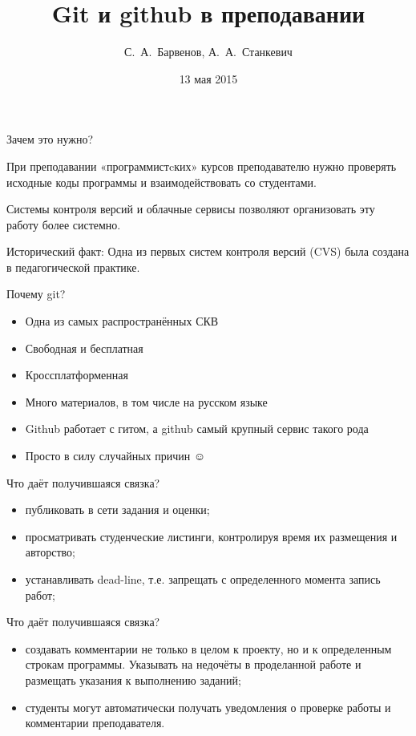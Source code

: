\documentclass[xetex,14pt,serif,compress,hyperref={xetex}]{beamer}
\author{С.~А.~Барвенов, А.~А.~Станкевич}
\title{Git и github в преподавании}
\date{13 мая 2015}
\begin{document}
\begin{frame}
\titlepage
\end{frame}
\begin{frame}{Зачем это нужно?}

\parbox{\linewidth}{\Large{При преподавании «программистcких» курсов 
преподавателю нужно проверять 
исходные коды программы и взаимодействовать со студентами.}}


\end{frame}
\begin{frame}
\parbox{\linewidth}{\Large{Системы контроля версий и облачные сервисы позволяют 
организовать эту работу более системно.}}
\end{frame}
\begin{frame}
\begin{block}{Исторический факт:}
  Одна из первых систем контроля версий (CVS) была создана в 
педагогической практике.
\end{block}
\end{frame}
\begin{frame}{Почему git?}
 \begin{itemize}
  \item Одна из самых распространённых СКВ
  \item Свободная и бесплатная
  \item Кроссплатформенная
  \item Много материалов, в том числе на русском языке
  \item Github работает с гитом, а github самый крупный сервис такого рода
  \item Просто в силу случайных причин ☺
 \end{itemize}

\end{frame}
\begin{frame}{Что даёт получившаяся связка?}
 \begin{itemize}
  \item публиковать в сети задания и оценки;

\item просматривать студенческие листинги, контролируя время их размещения и 
авторство;

\item устанавливать dead-line, т.е. запрещать с определенного момента запись 
работ;

 \end{itemize}

\end{frame}
\begin{frame}{Что даёт получившаяся связка?}
 \begin{itemize}
\item создавать комментарии не только в целом к проекту, но и к определенным 
строкам программы. Указывать на недочёты в проделанной работе и размещать 
указания к выполнению заданий;

\item студенты могут автоматически получать  уведомления о проверке 
работы и 
комментарии преподавателя.
 \end{itemize}

\end{frame}
\end{document}
